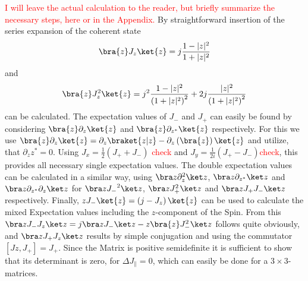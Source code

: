 \textcolor{red}{I will leave the actual calculation to the reader, but briefly summarize the necessary steps, here or in the Appendix.}
By straightforward insertion of the series expansion of the coherent state
\begin{equation}
\bra{z} J_z \ket{z} = j \frac{1 - |z|^2}{1 + |z|^2}
\end{equation}
and 
\begin{equation}
\bra{z} J_z^2 \ket{z} = j^2 \frac{1 - |z|^2}{\left(1 + |z|^2\right)^2} + 2j \frac{|z|^2}{\left(1 + |z|^2\right)^2}
\end{equation}
can be calculated.
The expectation values of $J_-$ and $J_+$ can easily be found by considering $\bra{z} \partial_z \ket{z}$ and $\bra{z} \partial_{z^*} \ket{z}$ respectively. 
For this we use  $\bra{z} \partial_z \ket{z} =  \partial_z \braket{z|z} - \partial_z\left(\bra{z}\right) \ket{z}$ and utilize, that $\partial_z z^* = 0$.
Using $J_x =\frac{1}{2} \left(J_+ +  J_-\right)$ \textcolor{red}{check} and $J_y= \frac{1}{2i} \left(J_+ - J_-\right)$\textcolor{red}{check}, this provides all necessary single expectation values.
The double expectation values can be calculated in a similar way, using $\bra z \partial_z^2 \ket z$, $\bra z \partial_{z^*} \ket z$ and $\bra z \partial_{z^*} \partial_z \ket z$ for $\bra z {J_-}^2 \ket z$, $\bra z J_+^2 \ket z$ and $\bra z J_+ J_- \ket z$ respectively. 
Finally, $zJ_-\ket{z} = \left(j - J_z\right) \ket{z}$ can be used to calculate the mixed Expectation values including the $z$-component of the Spin. 
From this $\bra z J_- J_z\ket z = j\bra z J_-\ket z - z \bra{z} J_-^2\ket z $ follows quite obviously, and $\bra z J_+ J_z \ket z$ results by simple conjugation and using the commutator $\left[ Jz,J_+\right] = J_+$.
Since the Matrix is positive semidefinite it is sufficient to show that its determinant is zero, for $\Delta J_\parallel = 0$, which can easily be done for a $3 \times 3$-matrices.


